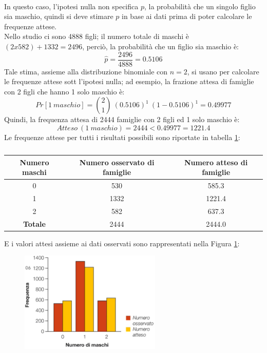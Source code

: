 \documentclass[10pt, draft]{book}
\newcounter{example}[section]
\begin{document}
\begin{example}
    \\
    In questo caso, l'ipotesi nulla non specifica $p$, la probabilità che un singolo figlio sia maschio, quindi si deve stimare $p$ in base ai dati prima di poter calcolare le frequenze attese.
    \\
    Nello studio ci sono 4888 figli; il numero totale di maschi è $(2 x 582) + 1332 = 2496$, perciò, la probabilità che un figlio sia maschio è:
    \begin{equation}
    \hat{p} = \frac{2496}{4888} = 0.5106
    \end{equation}
    Tale stima, assieme alla distribuzione binomiale con $n = 2$, si usano per calcolare le frequenze attese sott l'ipotesi nulla; ad esempio, la frazione attesa di famiglie con 2 figli che hanno 1 solo maschio è:
    \begin{equation}
    Pr[1\ maschio] = \binom{2}{1}\ (0.5106)^1\ (1-0.5106)^1 = 0.49977
    \end{equation}
    Quindi, la frequenza attesa di 2444 famiglie con 2 figli ed 1 solo maschio è:
    \begin{equation}
    Atteso\ (1\ maschio) = 2444 < 0.49977 = 1221.4
    \end{equation}
    Le frequenze attese per tutti i risultati possibili sono riportate in tabella \ref{tabmaschi2}:
    \begin{table}[H]
        \centering
        \renewcommand\arraystretch{1.2}
        \begin{tabular}{c|c|c}
        \hline
        \textbf{Numero maschi} & \textbf{Numero osservato di famiglie} & \textbf{Numero atteso di famiglie}\\
        \hline
        0 & 530 & 585.3\\
        1 & 1332 & 1221.4\\
        2 & 582 & 637.3\\
        \hline
        \textbf{Totale} & 2444 & 2444.0\\
        \hline
        \end{tabular}
        \caption{}
        \label{tabmaschi2}
    \end{table}\noindent
    E i valori attesi assieme ai dati osservati sono rappresentati nella Figura \ref{fig8.5-1}:
    \begin{figure}[H]\label{fig8.5-1}
    \centering
    \includegraphics[width=0.6\textwidth]{fig8.5-1}

\end{figure}
\end{example}
\end{document}
